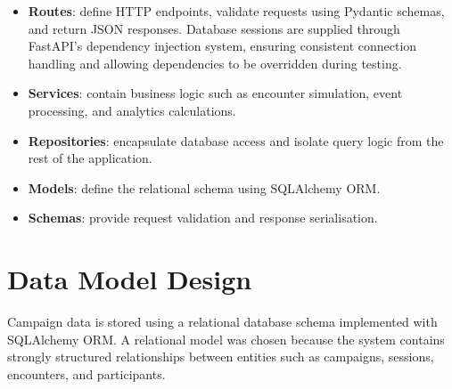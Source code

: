 \documentclass[11pt]{article}
\begin{document}
\begin{itemize}
\item \textbf{Routes}: define HTTP endpoints, validate requests using Pydantic schemas, and return JSON responses. Database sessions are supplied through FastAPI's dependency injection system, ensuring consistent connection handling and allowing dependencies to be overridden during testing.

\item \textbf{Services}: contain business logic such as encounter simulation, event processing, and analytics calculations.

\item \textbf{Repositories}: encapsulate database access and isolate query logic from the rest of the application.

\item \textbf{Models}: define the relational schema using SQLAlchemy ORM.

\item \textbf{Schemas}: provide request validation and response serialisation.
\end{itemize}

\section{Data Model Design}

Campaign data is stored using a relational database schema implemented
with SQLAlchemy ORM. A relational model was chosen because the system
contains strongly structured relationships between entities such as
campaigns, sessions, encounters, and participants.
\end{document}
